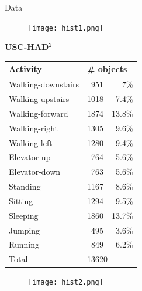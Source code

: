 \documentclass{beamer}
\begin{document}
\begin{frame}{Data}
\begin{minipage}[t]{0.45\linewidth}
\end{minipage}
\hspace{-0.65cm}
\begin{minipage}[t]{0.02\columnwidth}
	\vspace{0.78cm}
	\begin{figure}[h]
		\centering
		\texttt{[image: hist1.png]}
	\end{figure}
\end{minipage}
\hfill
\begin{minipage}[t]{0.47\linewidth}
	\textbf{USC-HAD}$^2$
	\begin{table}[]
		\scriptsize
		\label{my-label}
		\begin{tabular}{l|rr}
			\hline
			\textbf{Activity} & \multicolumn{2}{l}{\textbf{\# objects}} \\ \hline
			Walking-downstairs & 951 & 7\%  \\
			Walking-upstairs        & 1018&7.4\%  \\
			Walking-forward    & 1874&13.8\% \\
			Walking-right        & 1305&9.6\%  \\
			Walking-left        & 1280&9.4\%  \\
			Elevator-up        & 764&5.6\% \\
			Elevator-down        & 763&5.6\%  \\
			Standing           & 1167&8.6\%  \\
			Sitting            & 1294&9.5\%  \\
			Sleeping           & 1860&13.7\% \\
			Jumping        & 495&3.6\%  \\
			Running            & 849&6.2\%  \\ \hline 
			Total              & \multicolumn{2}{l}{13620}\\ 
			\hline
		\end{tabular}
	\end{table}
\end{minipage}
\hspace{-0.24cm}
\begin{minipage}[t]{0.02\columnwidth}
	\vspace{0.78cm}
	\begin{figure}[h]
		\centering
		\texttt{[image: hist2.png]}
	\end{figure}
\end{minipage}

\end{frame}
\end{document}
